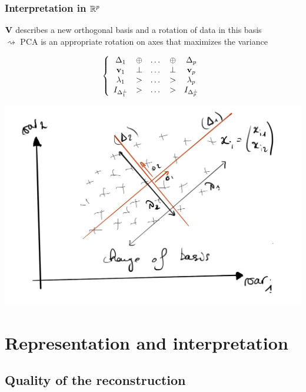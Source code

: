 \documentclass{beamer}\usepackage[]{graphicx}\usepackage[]{color}
\begin{document}
\begin{frame}
  \frametitle{Interpretation in $\mathbb{R}^p$}
    
  $\mathbf{V}$ describes a new orthogonal basis and a rotation of data in this basis\\
  $\rightsquigarrow$ PCA is an appropriate rotation on axes that maximizes the variance

  \begin{equation*}
    \left\{\begin{array}{ccccc}
      \Delta_1 & \oplus & \dots & \oplus & \Delta_p \\
      \mathbf{v}_1 & \bot & \dots & \bot & \mathbf{v}_p \\
      \lambda_1 & > & \dots & > & \lambda_p \\
      I_{\Delta_1^\bot} & > & \dots & > & I_{\Delta_p^\bot} \\
    \end{array}\right.
  \end{equation*}

  \includegraphics[width=.6\textwidth]{rotation}
\end{frame}


\section{Representation and interpretation}

\subsection{Quality of the reconstruction}
\end{document}
